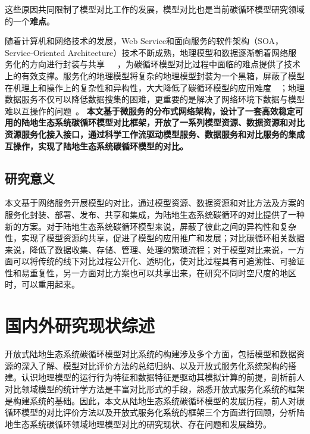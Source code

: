 这些原因共同限制了模型对比工作的发展，模型对比也是当前碳循环模型研究领域的一个\textbf{难点}。

随着计算机和网络技术的发展，Web Service和面向服务的软件架构（SOA，Service-Oriented Architecture）技术不断成熟，地理模型和数据逐渐朝着网络服务化的方向进行封装与共享~\cite{adgeo-4-69-2005}~\cite{peckham2009componentizing}~\cite{胡迪2015地理模型的服务化封装方法研究}，为碳循环模型对比过程中面临的难点提供了技术上的有效支撑。服务化的地理模型将复杂的地理模型封装为一个黑箱，屏蔽了模型在机理上和操作上的复杂性和异构性，大大降低了碳循环模型的应用难度~\cite{胡迪2015地理模型的服务化封装方法研究}~\cite{yue2016service}；地理数据服务不仅可以降低数据搜集的困难，更重要的是解决了网络环境下数据与模型难以互操作的问题~\cite{Yue2015A}。
\textbf{本文基于微服务的分布式网络架构，设计了一套高效稳定可用的陆地生态系统碳循环模型对比框架，开放了一系列模型资源、数据资源和对比资源服务化接入接口，通过科学工作流驱动模型服务、数据服务和对比服务的集成互操作，实现了陆地生态系统碳循环模型的对比。}

\subsection{研究意义}

本文基于网络服务开展模型的对比，通过模型资源、数据资源和对比方法及方案的服务化封装、部署、发布、共享和集成，为陆地生态系统碳循环的对比提供了一种新的方案。对于陆地生态系统碳循环模型来说，屏蔽了彼此之间的异构性和复杂性，实现了模型资源的共享，促进了模型的应用推广和发展；对比碳循环相关数据来说，降低了数据收集、存储、管理、处理的繁琐流程；对于模型对比来说，一方面可以将传统的线下对比过程公开化、透明化，使对比过程具有可追溯性、可验证性和易重复性，另一方面对比方案也可以共享出来，在研究不同时空尺度的地区时，可以重用起来。

\section{国内外研究现状综述}
开放式陆地生态系统碳循环模型对比系统的构建涉及多个方面，包括模型和数据资源的深入了解、模型对比评价方法的总结归纳、以及开放式服务化系统架构的搭建。认识地理模型的运行行为特征和数据特征是驱动其模拟计算的前提，剖析前人对比领域模型的统计学方法是丰富对比形式的手段，熟悉开放式服务化系统的框架是构建系统的基础。因此，本文从陆地生态系统碳循环模型的发展历程，前人对碳循环模型的对比评价方法以及开放式服务化系统的框架三个方面进行回顾，分析陆地生态系统碳循环领域地理模型对比的研究现状、存在问题和发展趋势。

